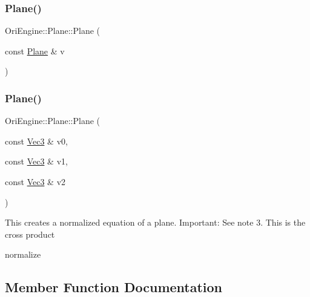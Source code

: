 \hypertarget{struct_ori_engine_1_1_plane_ac25785437dcaacb2adb0b3667cf78fda}{}\label{struct_ori_engine_1_1_plane_ac25785437dcaacb2adb0b3667cf78fda} 
\subsubsection{\texorpdfstring{Plane()}{Plane()}\hspace{0.1cm}{\footnotesize\ttfamily [3/4]}}
{\footnotesize\ttfamily Ori\+Engine\+::\+Plane\+::\+Plane (\begin{DoxyParamCaption}\item[{const \hyperlink{struct_ori_engine_1_1_plane}{Plane} \&}]{v }\end{DoxyParamCaption})\hspace{0.3cm}{\ttfamily [inline]}}

\hypertarget{struct_ori_engine_1_1_plane_abffb56ba7a6f9824664be9037ebbec8c}{}\label{struct_ori_engine_1_1_plane_abffb56ba7a6f9824664be9037ebbec8c} 
\subsubsection{\texorpdfstring{Plane()}{Plane()}\hspace{0.1cm}{\footnotesize\ttfamily [4/4]}}
{\footnotesize\ttfamily Ori\+Engine\+::\+Plane\+::\+Plane (\begin{DoxyParamCaption}\item[{const \hyperlink{struct_ori_engine_1_1_vec3}{Vec3} \&}]{v0,  }\item[{const \hyperlink{struct_ori_engine_1_1_vec3}{Vec3} \&}]{v1,  }\item[{const \hyperlink{struct_ori_engine_1_1_vec3}{Vec3} \&}]{v2 }\end{DoxyParamCaption})\hspace{0.3cm}{\ttfamily [inline]}}

This creates a normalized equation of a plane. Important\+: See note 3. This is the cross product

normalize 

\subsection{Member Function Documentation}
\hypertarget{struct_ori_engine_1_1_plane_af61832e1aeaff5074e9fd035ac5b8fa4}{}\label{struct_ori_engine_1_1_plane_af61832e1aeaff5074e9fd035ac5b8fa4} 
